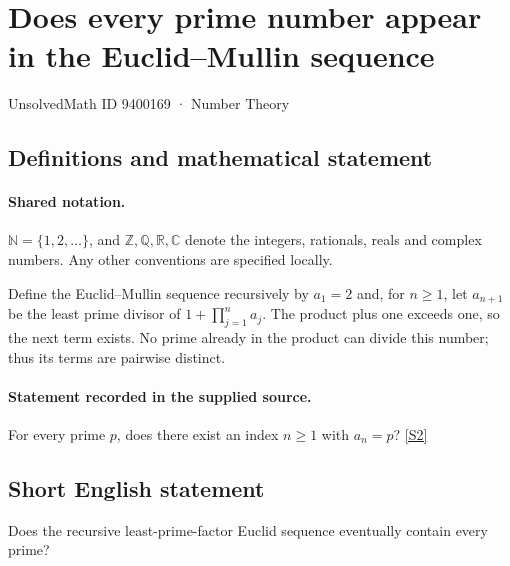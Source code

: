 \documentclass[11pt]{article}
\newcommand{\sref}[2]{\hyperlink{source:#1:#2}{[S#2]}}
\begin{document}
\setcounter{section}{9400168}
\section{Does every prime number appear in the Euclid–Mullin sequence}\label{9400169}
{\small\sffamily UnsolvedMath ID 9400169 · Number Theory}
\subsection{Definitions and mathematical statement}

\paragraph{Shared notation.}$\mathbb N=\{1,2,\ldots\}$, and $\mathbb Z,\mathbb Q,\mathbb R,\mathbb C$ denote the integers, rationals, reals and complex numbers. Any other conventions are specified locally.


Define the Euclid--Mullin sequence recursively by $a_1=2$ and, for $n\ge1$, let $a_{n+1}$ be the least prime divisor of $1+\prod_{j=1}^n a_j$. The product plus one exceeds one, so the next term exists. No prime already in the product can divide this number; thus its terms are pairwise distinct.
\paragraph{Statement recorded in the supplied source.}
For every prime $p$, does there exist an index $n\ge1$ with $a_n=p$? \sref{9400169}{2}
\subsection{Short English statement}
Does the recursive least-prime-factor Euclid sequence eventually contain every prime?
\end{document}
